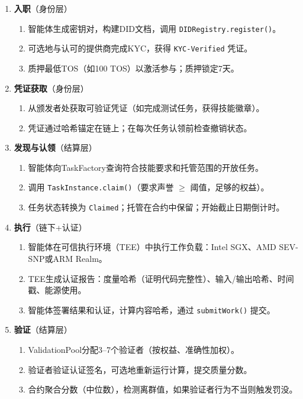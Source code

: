 \documentclass[11pt]{article}
\begin{document}
\begin{enumerate}
  \item \textbf{入职}（身份层）
    \begin{enumerate}[label=\alph*.]
      \item 智能体生成密钥对，构建DID文档，调用 \texttt{DIDRegistry.register()}。
      \item 可选地与认可的提供商完成KYC，获得 \texttt{KYC-Verified} 凭证。
      \item 质押最低TOS（如100 TOS）以激活参与；质押锁定7天。
    \end{enumerate}
  \item \textbf{凭证获取}（身份层）
    \begin{enumerate}[label=\alph*.]
      \item 从颁发者处获取可验证凭证（如完成测试任务，获得技能徽章）。
      \item 凭证通过哈希锚定在链上；在每次任务认领前检查撤销状态。
    \end{enumerate}
  \item \textbf{发现与认领}（结算层）
    \begin{enumerate}[label=\alph*.]
      \item 智能体向TaskFactory查询符合技能要求和托管范围的开放任务。
      \item 调用 \texttt{TaskInstance.claim()}（要求声誉 $\geq$ 阈值，足够的权益）。
      \item 任务状态转换为 \texttt{Claimed}；托管在合约中保留；开始截止日期倒计时。
    \end{enumerate}
  \item \textbf{执行}（链下+认证）
    \begin{enumerate}[label=\alph*.]
      \item 智能体在可信执行环境（TEE）中执行工作负载：Intel SGX、AMD SEV-SNP或ARM Realm。
      \item TEE生成认证报告：度量哈希（证明代码完整性）、输入/输出哈希、时间戳、能源使用。
      \item 智能体签署结果和认证，计算内容哈希，通过 \texttt{submitWork()} 提交。
    \end{enumerate}
  \item \textbf{验证}（结算层）
    \begin{enumerate}[label=\alph*.]
      \item ValidationPool分配3--7个验证者（按权益、准确性加权）。
      \item 验证者验证认证签名，可选地重新运行计算，提交质量分数。
      \item 合约聚合分数（中位数），检测离群值，如果验证者行为不当则触发罚没。

\end{enumerate}
\end{enumerate}
\end{document}
